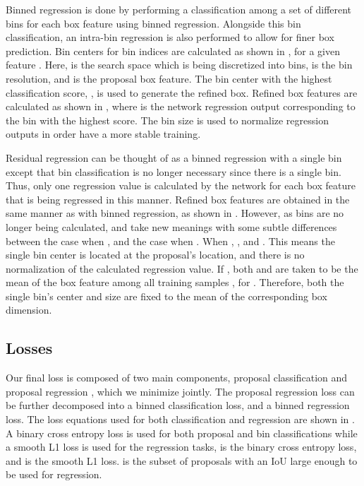 \documentclass[10pt,twocolumn,letterpaper]{article}
\begin{document}
Binned regression is done by performing a classification among a set  of different bins for each box feature  using binned regression.
Alongside this bin classification, an intra-bin regression is also performed to allow for finer box prediction.
Bin centers  for bin indices  are calculated as shown in , for a given feature .
Here,  is the search space which is being discretized into bins,  is the bin resolution, and  is the proposal box feature.
The bin center with the highest classification score, , is used to generate the refined box.
Refined box features  are calculated as shown in , where  is the network regression output corresponding to the bin with the highest score.
The bin size  is used to normalize regression outputs in order have a more stable training.











    


Residual regression can be thought of as a binned regression with a single bin except that bin classification is no longer necessary since there is a single bin.
Thus, only one regression value  is calculated by the network for each box feature  that is being regressed in this manner.
Refined box features are obtained in the same manner as with binned regression, as shown in .
However, as bins are no longer being calculated,  and  take new meanings with some subtle differences between the case when , and the case when .
When , , and .
This means the single bin center is located at the proposal's  location, and there is no normalization of the calculated regression value.
If , both  and  are taken to be the mean of the box feature among all training samples \ie , for .
Therefore, both the single bin's center and size are fixed to the mean of the corresponding box dimension.










\subsection{Losses}
Our final loss is composed of two main components, proposal classification  and proposal regression , which we minimize jointly.
The proposal regression loss can be further decomposed into a binned classification loss, and a binned regression loss.
The loss equations used for both classification and regression are shown in .
A binary cross entropy loss is used for both proposal and bin classifications while a
smooth L1 loss is used for the regression tasks, \ie  is the binary cross entropy loss, and  is the smooth L1 loss.
 is the subset of proposals with an IoU large enough to be used for regression.
\end{document}
